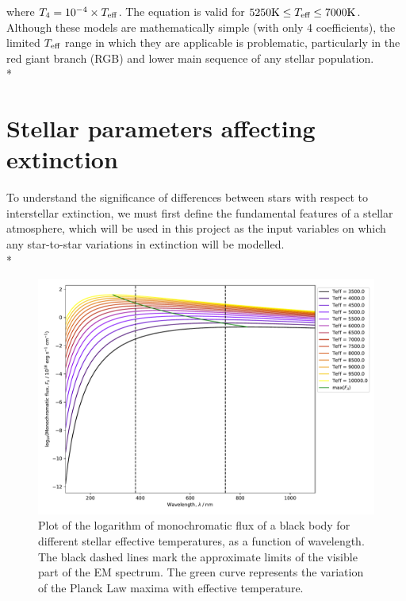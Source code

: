 \documentclass[12pt, a4paper]{report}
\begin{document}
where $T_{4} = 10^{-4} \times T_{\textnormal{eff}}$. The equation is valid for $5250\textnormal{K} \leq T_{\textnormal{eff}} \leq 7000\textnormal{K}$. Although these models are mathematically simple (with only 4 coefficients), the limited $T_{\textnormal{eff}}$ range in which they are applicable is problematic, particularly in the red giant branch (RGB) and lower main sequence of any stellar population.\\*

\section{Stellar parameters affecting extinction} \label{params}
To understand the significance of differences between stars with respect to interstellar extinction, we must first define the fundamental features of a stellar atmosphere, which will be used in this project as the input variables on which any star-to-star variations in extinction will be modelled. \\*

\begin{figure}[h]
\begin{center}
\includegraphics[width=1.0\textwidth]{blackbody_teff_logF_illustration.pdf}
\caption{Plot of the logarithm of monochromatic flux of a black body for different stellar effective temperatures, as a function of wavelength. The black dashed lines mark the approximate limits of the visible part of the EM spectrum. The green curve represents the variation of the Planck Law maxima with effective temperature.}
\label{planck_curve}
\end{center}
\end{figure}
\end{document}
